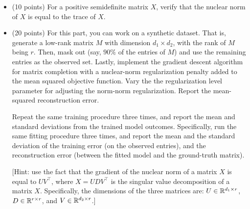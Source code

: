 \documentclass[11pt]{article}
\begin{document}
\begin{itemize}
    \item (10 points) For a positive semidefinite matrix $X$, verify that the nuclear norm of $X$ is equal to the trace of $X$.

    \item (20 points) For this part, you can work on a synthetic dataset.
    That is, generate a low-rank matrix $M$ with dimension $d_1 \times d_2$, with the rank of $M$ being $r$.
    Then, mask out (say, $90\%$ of the entries of $M$) and use the remaining entries as the observed set.
    Lastly, implement the gradient descent algorithm for matrix completion with a nuclear-norm regularization penalty added to the mean squared objective function.
    Vary the the regularization level parameter for adjusting the norm-norm regularization.
    Report the mean-squared reconstruction error.
    
    Repeat the same training procedure three times, and report the mean and standard deviations from the trained model outcomes.
    Specifically, run the same fitting procedure three times, and report the mean and the standard deviation of the training error (on the observed entries), and the reconstruction error (between the fitted model and the ground-truth matrix).

    [Hint: use the fact that the gradient of the nuclear norm of a matrix $X$ is equal to $U V^{\top}$, where $X = U D V^{\top}$ is the singular value decomposition of a matrix $X$. Specifically, the dimensions of the three matrices are: $U \in \mathbb{R}^{d_1 \times r}$, $D \in \mathbb{R}^{r \times r}$, and $V \in \mathbb{R}^{d_2 \times r}$.]
\end{itemize}
\end{document}
